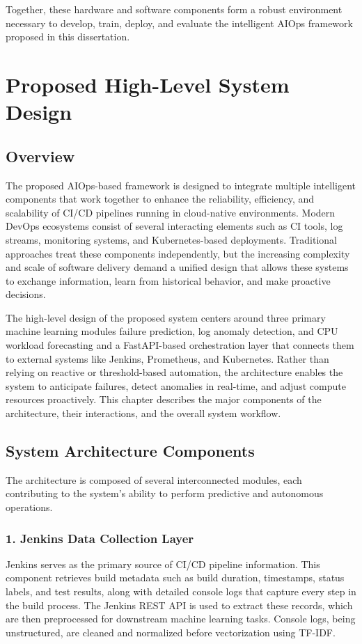 \documentclass[12pt]{report}
\begin{document}
\noindent
Together, these hardware and software components form a robust environment necessary to develop, train, deploy, and evaluate the intelligent AIOps framework proposed in this dissertation.


\clearpage
\chapter{Proposed High-Level System Design}

\section{Overview}

The proposed AIOps-based framework is designed to integrate multiple intelligent components that work together to enhance the reliability, efficiency, and scalability of CI/CD pipelines running in cloud-native environments. Modern DevOps ecosystems consist of several interacting elements such as CI tools, log streams, monitoring systems, and Kubernetes-based deployments. Traditional approaches treat these components independently, but the increasing complexity and scale of software delivery demand a unified design that allows these systems to exchange information, learn from historical behavior, and make proactive decisions.

The high-level design of the proposed system centers around three primary machine learning modules failure prediction, log anomaly detection, and CPU workload forecasting and a FastAPI-based orchestration layer that connects them to external systems like Jenkins, Prometheus, and Kubernetes. Rather than relying on reactive or threshold-based automation, the architecture enables the system to anticipate failures, detect anomalies in real-time, and adjust compute resources proactively. This chapter describes the major components of the architecture, their interactions, and the overall system workflow.

\section{System Architecture Components}

The architecture is composed of several interconnected modules, each contributing to the system’s ability to perform predictive and autonomous operations.

\subsection*{1. Jenkins Data Collection Layer}
Jenkins serves as the primary source of CI/CD pipeline information. This component retrieves build metadata such as build duration, timestamps, status labels, and test results, along with detailed console logs that capture every step in the build process. The Jenkins REST API is used to extract these records, which are then preprocessed for downstream machine learning tasks. Console logs, being unstructured, are cleaned and normalized before vectorization using TF-IDF.
\end{document}
